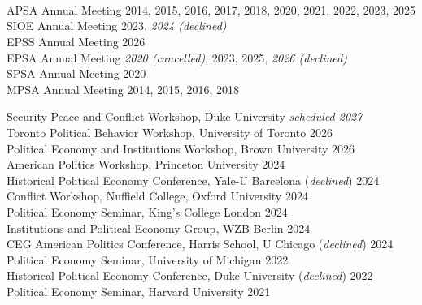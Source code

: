 \documentclass[11pt]{article}
\begin{document}
\vspace{.3in}
\begin{minipage}[t]{.21\textwidth}
	 \\
	\hspace*{.18in}  \\
	\hspace*{.58in}   \\
\end{minipage}
\begin{minipage}[t]{.79\textwidth}
APSA Annual Meeting \hfill 2014, 2015, 2016, 2017, 2018, 2020, 2021, 2022, 2023, 2025 \\
SIOE Annual Meeting \hfill 2023, \emph{2024 (declined)} \\
EPSS Annual Meeting \hfill 2026 \\
EPSA Annual Meeting \hfill \emph{2020 (cancelled)}, 2023, 2025, \emph{2026 (declined)} \\
SPSA Annual Meeting \hfill 2020 \\
MPSA Annual Meeting \hfill 2014, 2015, 2016, 2018 \\

\end{minipage}

\vspace{.3in}
\begin{minipage}[t]{.21\textwidth}
	\hspace*{.18in} \so{}
\end{minipage}
\begin{minipage}[t]{.79\textwidth}
Security Peace and Conflict Workshop, Duke University \hfill \emph{scheduled 2027} \\
Toronto Political Behavior Workshop, University of Toronto  \hfill 2026 \\
Political Economy and Institutions Workshop, Brown University  \hfill 2026 \\
American Politics Workshop, Princeton University  \hfill 2024 \\
Historical Political Economy Conference, Yale-U Barcelona (\emph{declined}) \hfill 2024 \\
Conflict Workshop, Nuffield College, Oxford University \hfill 2024 \\
Political Economy Seminar, King's College London \hfill 2024 \\
Institutions and Political Economy Group, WZB Berlin \hfill 2024 \\
CEG American Politics Conference, Harris School, U Chicago (\emph{declined}) \hfill 2024 \\
Political Economy Seminar, University of Michigan \hfill 2022 \\
Historical Political Economy Conference, Duke University (\emph{declined}) \hfill 2022 \\
Political Economy Seminar, Harvard University \hfill 2021 \\
\end{minipage}
\end{document}
